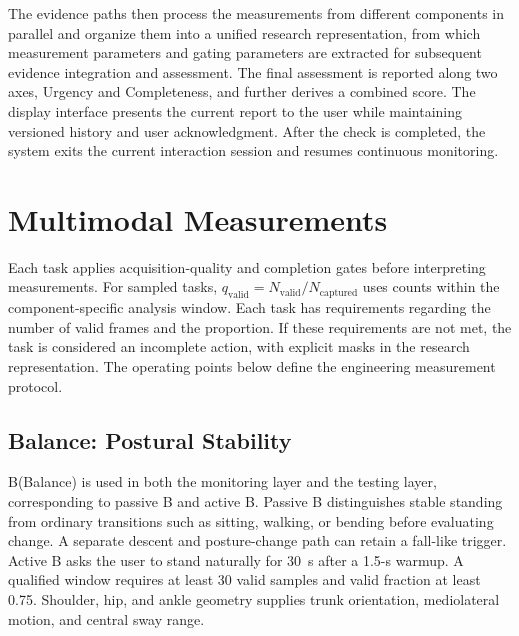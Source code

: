 \documentclass[conference]{IEEEtran}
\begin{document}
The evidence paths then process the measurements from different components in parallel and organize them into a unified research representation, from which measurement parameters and gating parameters are extracted for subsequent evidence integration and assessment. The final assessment is reported along two axes, Urgency and Completeness, and further derives a combined score. The display interface presents the current report to the user while maintaining versioned history and user acknowledgment. After the check is completed, the system exits the current interaction session and resumes continuous monitoring.





\section{Multimodal Measurements}
\label{sec:methods}
Each task applies acquisition-quality and completion gates before interpreting measurements. For sampled tasks, $q_{\mathrm{valid}}=N_{\mathrm{valid}}/N_{\mathrm{captured}}$ uses counts within the component-specific analysis window.
Each task has requirements regarding the number of valid frames and the proportion. If these requirements are not met, the task is considered an incomplete action, with explicit masks in the research representation.
The operating points below define the engineering measurement protocol.

\subsection{Balance: Postural Stability}
\label{subsec:balance}
B(Balance) is used in both the monitoring layer and the testing layer, corresponding to passive B and active B.
Passive B distinguishes stable standing from ordinary transitions such as
sitting, walking, or bending before evaluating change. A separate descent and
posture-change path can retain a fall-like trigger. Active B asks the user to
stand naturally for 30~s after a 1.5-s warmup. A qualified window requires
at least 30 valid samples and valid fraction at least 0.75. Shoulder, hip, and
ankle geometry supplies trunk
orientation, mediolateral motion, and central sway range.
\end{document}
